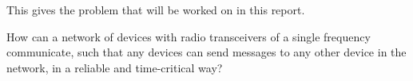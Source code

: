 This gives the problem that will be worked on in this report.



\bigskip

{\addtolength{\leftskip}{10mm}\addtolength{\rightskip}{10mm}\noindent\hrulefill\it

\noindent How can a network of devices with radio transceivers of a single frequency communicate, such that any devices can send messages to any other device in the network, in a reliable and time-critical way?

\noindent\hrulefill

}



